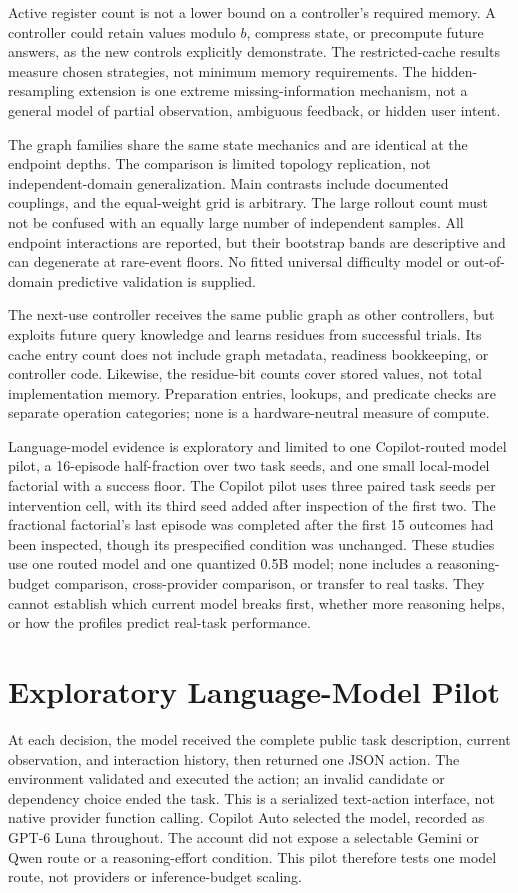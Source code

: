 \documentclass[sigconf,nonacm]{acmart}
\begin{document}
Active register count is not a lower bound on a controller's required
memory. A controller could retain values modulo $b$, compress state, or
precompute future answers, as the new controls explicitly demonstrate.
The restricted-cache results measure chosen strategies, not minimum
memory requirements. The hidden-resampling extension is one extreme
missing-information mechanism, not a general model of partial observation,
ambiguous feedback, or hidden user intent.

The graph families share the same state mechanics and are identical at the
endpoint depths. The comparison is limited topology replication, not
independent-domain generalization. Main contrasts include documented
couplings, and the equal-weight grid is arbitrary. The large rollout count
must not be confused with an equally large number of independent samples.
All endpoint interactions are reported, but their bootstrap bands are
descriptive and can degenerate at rare-event floors. No fitted universal
difficulty model or out-of-domain predictive validation is supplied.

The next-use controller receives the same public graph as other controllers,
but exploits future query knowledge and learns residues from successful
trials. Its cache entry count does not include graph metadata, readiness
bookkeeping, or controller code. Likewise, the residue-bit counts cover
stored values, not total implementation memory. Preparation entries,
lookups, and predicate checks are separate operation categories;
none is a hardware-neutral measure of compute.

Language-model evidence is exploratory and limited to one Copilot-routed
model pilot, a 16-episode half-fraction over two task seeds, and one small
local-model factorial with a success floor. The Copilot pilot uses three
paired task seeds per intervention cell, with its third seed added after
inspection of the first two. The fractional factorial's last episode was
completed after the first 15 outcomes had been inspected, though its
prespecified condition was unchanged. These studies use one routed model
and one quantized 0.5B model; none includes a reasoning-budget comparison,
cross-provider comparison, or transfer to real tasks. They cannot establish
which current model breaks first, whether more reasoning helps, or how the
profiles predict real-task performance.

\section{Exploratory Language-Model Pilot}
At each decision, the model received the complete public task description,
current observation, and interaction history, then returned one JSON action.
The environment validated and executed the action; an invalid candidate or
dependency choice ended the task. This is a serialized text-action
interface, not native provider function calling. Copilot Auto selected the
model, recorded as GPT-6 Luna throughout. The account did not expose a
selectable Gemini or Qwen route or a reasoning-effort condition. This pilot
therefore tests one model route, not providers or inference-budget scaling.
\end{document}
